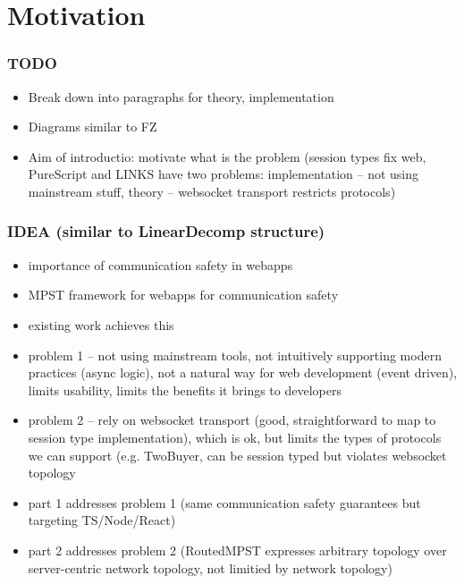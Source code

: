 \section{Motivation}
\label{section:intro}

\subsubsection{TODO}
\begin{itemize}
\item Break down into paragraphs for theory, implementation
\item Diagrams similar to FZ
\item Aim of introductio: motivate what is the problem 
(session types fix web, PureScript and LINKS have two problems: 
implementation -- not using mainstream stuff, 
theory -- websocket transport restricts protocols)
\end{itemize}

\subsubsection{IDEA (similar to LinearDecomp structure)}
\begin{itemize}
\item importance of communication safety in webapps
\item MPST framework for webapps for communication safety
\item existing work achieves this
\item problem 1 -- not using mainstream tools, not intuitively supporting modern practices (async logic), not a natural way for web development (event driven), limits usability, limits the benefits it brings to developers
\item problem 2 -- rely on websocket transport (good, straightforward to map to session type implementation), which is ok, but limits the types of protocols we can support (e.g. TwoBuyer, can be session typed but violates websocket topology
\item part 1 addresses problem 1 (same communication safety guarantees but targeting TS/Node/React)
\item part 2 addresses problem 2 (RoutedMPST expresses arbitrary topology over server-centric network topology, not limitied by network topology)
\end{itemize}



